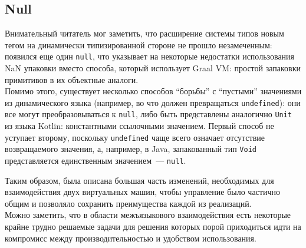 \documentclass[times,specification,annotation]{itmo-student-thesis}
\begin{document}
\subsection{Null}
Внимательный читатель мог заметить, что расширение системы типов новым тегом на динамически типизированной стороне не прошло незамеченным: появился еще один \texttt{null}, что указывает на некоторые недостатки использования NaN упаковки вместо способа, который использует Graal VM: простой запаковки примитивов в их объектные аналоги.\\
Помимо этого, существует несколько способов ``борьбы'' с ``пустыми'' значениями из динамического языка (например, во что должен превращаться \texttt{undefined}): они все могут преобразовываться к \texttt{null}, либо быть представлены аналогично \texttt{Unit} из языка Kotlin: константными ссылочными значением. Первый способ не уступает второму, поскольку \texttt{undefined} чаще всего означает отсутствие возвращаемого значения, а, например, в Java, запакованный тип \texttt{Void} представляется единственным значением~--- \texttt{null}.

\chapterconclusion
Таким образом, была описана большая часть изменений, необходимых для взаимодействия двух виртуальных машин, чтобы управление было частично общим и позволяло сохранить преимущества каждой из реализаций.\\
Можно заметить, что в области межъязыкового взаимодействия есть некоторые крайне трудно решаемые задачи для решения которых порой приходиться идти на компромисс между производительностью и удобством использования.
\end{document}
